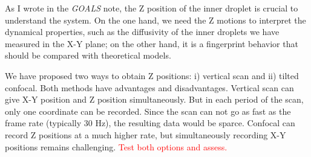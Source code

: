 \documentclass[onecolumn,aps, pre,amsmath,amssymb,longbibliography,12pt]{revtex4-2}
\begin{document}
As I wrote in the \textit{GOALS} note, the Z position of the inner droplet is crucial to understand the system.
On the one hand, we need the Z motions to interpret the dynamical properties, such as the diffusivity of the inner droplets we have measured in the X-Y plane;
on the other hand, it is a fingerprint behavior that should be compared with theoretical models.

We have proposed two ways to obtain Z positions: i) vertical scan and ii) tilted confocal.
Both methods have advantages and disadvantages.
Vertical scan can give X-Y position and Z position simultaneously.
But in each period of the scan, only one coordinate can be recorded.
Since the scan can not go as fast as the frame rate (typically 30 Hz), the resulting data would be sparce.
Confocal can record Z positions at a much higher rate, but simultaneously recording X-Y positions remains challenging.
\textcolor{red}{Test both options and assess.}
\end{document}
